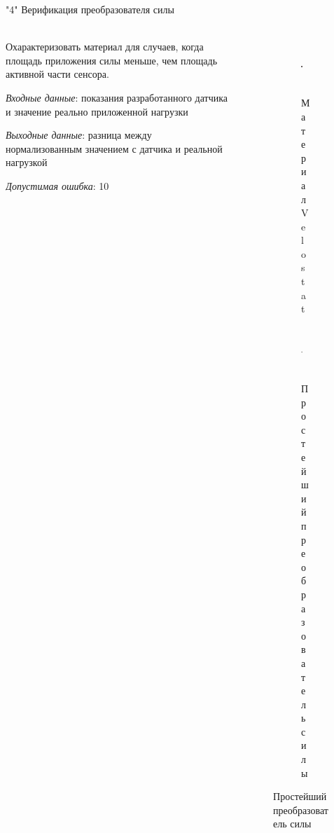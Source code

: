 \documentclass[aspectratio=169,xcolor=table,10pt]{beamer}
\begin{document}
\begin{frame}[t]{"4" Верификация преобразователя силы}
    \framesubtitle{}
    \begin{columns}[T,onlytextwidth]
        \begin{column}{0.49\textwidth}
            Охарактеризовать материал для случаев, когда площадь приложения силы меньше, чем площадь активной части сенсора.

            \textit{Входные данные}: показания разработанного датчика и значение реально приложенной нагрузки

            \textit{Выходные данные}: разница между нормализованным значением с датчика и реальной нагрузкой

            \textit{Допустимая ошибка}: 10%
        \end{column}
        \begin{column}{0.49\textwidth}
            \begin{figure}[H]
                \begin{subfigure}{0.9\textwidth}
                    \centering\includegraphics[height=2cm,width=1\textwidth,keepaspectratio]{velostat_sensor.jpg}
                    \caption{Материал Velostat}
                    \label{fig:velostat_sensor.jpg}
                \end{subfigure}

                \begin{subfigure}{0.9\textwidth}
                    \centering\includegraphics[height=2cm,width=1\textwidth,keepaspectratio]{simplest_sensor.jpg}
                    \caption{Простейший преобразователь силы}
                    \label{fig:simplest_sensor.jpg}
                \end{subfigure}
            \end{figure}
        \end{column}
    \end{columns}
\end{frame}
\end{document}

